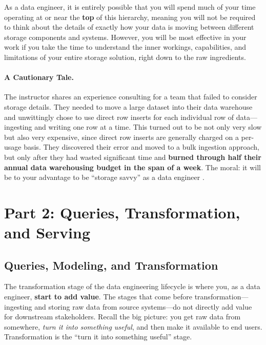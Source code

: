 \documentclass{article}
\begin{document}
As a data engineer, it is entirely possible that you will spend much of your time operating at or near the \textbf{top} of this hierarchy, meaning you will not be required to think about the details of exactly how your data is moving between different storage components and systems. However, you will be most effective in your work if you take the time to understand the inner workings, capabilities, and limitations of your entire storage solution, right down to the raw ingredients.

\paragraph{A Cautionary Tale.} The instructor shares an experience consulting for a team that failed to consider storage details. They needed to move a large dataset into their data warehouse and unwittingly chose to use direct row inserts for each individual row of data---ingesting and writing one row at a time. This turned out to be not only very slow but also very expensive, since direct row inserts are generally charged on a per-usage basis. They discovered their error and moved to a bulk ingestion approach, but only after they had wasted significant time and \textbf{burned through half their annual data warehousing budget in the span of a week}. The moral: it will be to your advantage to be ``storage savvy'' as a data engineer \cite{reis2022fundamentals}.

\newpage

\section{Part 2: Queries, Transformation, and Serving}

\subsection{Queries, Modeling, and Transformation}
The transformation stage of the data engineering lifecycle is where you, as a data engineer, \textbf{start to add value}. The stages that come before transformation---ingesting and storing raw data from source systems---do not directly add value for downstream stakeholders. Recall the big picture: you get raw data from somewhere, \textit{turn it into something useful}, and then make it available to end users. Transformation is the ``turn it into something useful'' stage.
\end{document}
